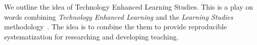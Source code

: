 
We outline the idea of Technology Enhanced Learning Studies.
This is a play on words combining \emph{Technology Enhanced Learning} and the 
\emph{Learning Studies} methodology~\cite{LearningStudy}.
The idea is to combine the them to provide reproducible systematization for 
researching and developing teaching.

